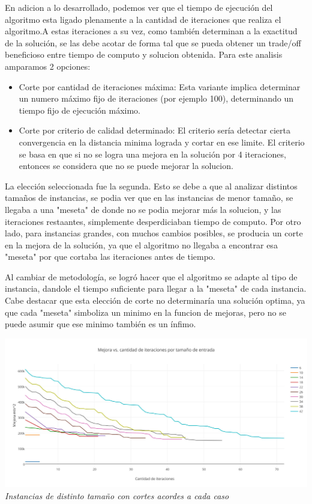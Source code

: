 En adicion a lo desarrollado, podemos ver que el tiempo de ejecución del algoritmo esta ligado plenamente a la cantidad de iteraciones que realiza el algoritmo.A estas iteraciones a su vez, como también determinan a la exactitud de la solución, se las debe acotar de forma tal que se pueda obtener un trade/off beneficioso entre tiempo de computo y solucion obtenida. Para este analisis amparamos 2 opciones:
\begin{itemize}
\item Corte por cantidad de iteraciones máxima: Esta variante implica determinar un numero máximo fijo de iteraciones (por ejemplo 100), determinando un tiempo fijo de ejecución máximo.
\item Corte por criterio de calidad determinado: El criterio sería detectar cierta convergencia en la distancia minima lograda y cortar en ese limite. El criterio se basa en que si no se logra una mejora en la solución por 4 iteraciones, entonces se considera que no se puede mejorar la solucion.
\end{itemize}

La elección seleccionada fue la segunda. Esto se debe a que al analizar distintos tamaños de instancias, se podia ver que en las instancias de menor tamaño, se llegaba a una "meseta" de donde no se podia mejorar más la solucion, y las iteraciones restaantes, simplemente desperdiciaban tiempo de computo. Por otro lado, para instancias grandes, con muchos cambios posibles, se producia un corte en la mejora de la solución, ya que el algoritmo no llegaba a encontrar esa "meseta" por que cortaba las iteraciones antes de tiempo. 

Al cambiar de metodología, se logró hacer que el algoritmo se adapte al tipo de instancia, dandole el tiempo suficiente para llegar a la "meseta" de cada instancia. Cabe destacar que esta elección de corte no determinaría una solución optima, ya que cada "meseta" simboliza un minimo en la funcion de mejoras, pero no se puede asumir que ese minimo también es un ínfimo.


  \begin{center}
 \includegraphics[scale=0.2]{./EJ4/mejora2.png}\\
 {            \textit{Instancias de distinto tamaño con cortes acordes a cada caso}}
  \end{center}
  \vspace*{0.3cm}
  

